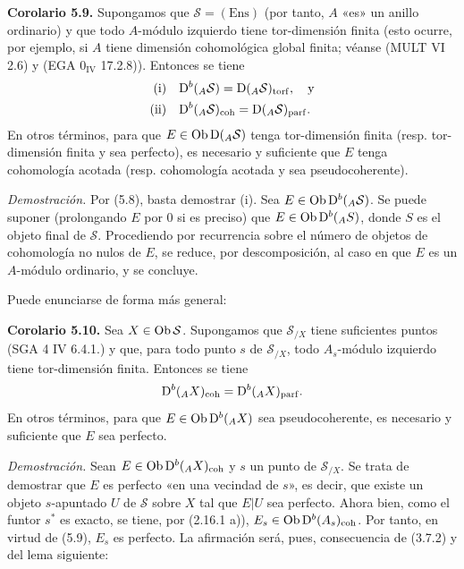 
\providecommand{\sisi}[2]{#2}

\textbf{Corolario 5.9.} Supongamos que \(\sisi{S}{\mathcal S}=(\mathrm{Ens})\) (por tanto, \(A\) «es» un anillo ordinario) y que todo \(A\)-módulo izquierdo tiene tor-dimensión finita (esto ocurre, por ejemplo, si \(A\) tiene dimensión cohomológica global finita; véanse (MULT VI 2.6) y (EGA \(0_{\mathrm{IV}}\) 17.2.8)). Entonces se tiene
\[
\begin{aligned}
\text{(i)}\quad & \Dpx^b({}_A \sisi{S}{\mathcal S})=\Dpx({}_A \sisi{S}{\mathcal S})_{\torf},\quad\text{y}\\
\text{(ii)}\quad & \Dpx^b({}_A \sisi{S}{\mathcal S})_{\mathrm{coh}}=\Dpx({}_A \sisi{S}{\mathcal S})_{\mathrm{parf}}.
\end{aligned}
\]
En otros términos, para que \(E\in\Ob\Dpx({}_A \sisi{S}{\mathcal S})\) tenga tor-dimensión finita (resp. tor-dimensión finita y sea perfecto), es necesario y suficiente que \(E\) tenga cohomología acotada (resp. cohomología acotada y sea pseudocoherente).

\emph{Demostración.} Por (5.8), basta demostrar (i). Sea \(E\in\Ob\Dpx^b({}_A \sisi{S}{\mathcal S})\). Se puede suponer (prolongando \(E\) por \(0\) si es preciso) que \(E\in\operatorname{Ob}\mathrm D^b({}_A S)\), donde \(S\) es el objeto final de \(\sisi{S}{\mathcal S}\). Procediendo por recurrencia sobre el número de objetos de cohomología no nulos de \(E\), se reduce, por descomposición, al caso en que \(E\) es un \(A\)-módulo ordinario, y se concluye.

Puede enunciarse de forma más general:

\textbf{Corolario 5.10.} Sea \(X\in\Ob \sisi{S}{\mathcal S}\). Supongamos que \(\sisi{S}{\mathcal S}_{/X}\) tiene suficientes puntos (SGA 4 IV 6.4.1.) y que, para todo punto \(s\) de \(\sisi{S}{\mathcal S}_{/X}\), todo \(A_s\)-módulo izquierdo tiene tor-dimensión finita. Entonces se tiene
\[
  \mathrm D^b({}_A X)_{\mathrm{coh}}=\mathrm D^b({}_A X)_{\mathrm{parf}}.
\]
En otros términos, para que \(E\in\operatorname{Ob}\mathrm D^b({}_A X)\) sea pseudocoherente, es necesario y suficiente que \(E\) sea perfecto.

\emph{Demostración.} Sean \(E\in\operatorname{Ob}\mathrm D^b({}_A X)_{\mathrm{coh}}\) y \(s\) un punto de \(\sisi{S}{\mathcal S}_{/X}\). Se trata de demostrar que \(E\) es perfecto «en una vecindad de \(s\)», es decir, que existe un objeto \(s\)-apuntado \(U\) de \(\sisi{S}{\mathcal S}\) sobre \(X\) tal que \(E|U\) sea perfecto. Ahora bien, como el funtor \(s^*\) es exacto, se tiene, por (2.16.1 a)), \(E_s\in\operatorname{Ob}\mathrm D^b(A_s)_{\mathrm{coh}}\). Por tanto, en virtud de (5.9), \(E_s\) es perfecto. La afirmación será, pues, consecuencia de (3.7.2) y del lema siguiente:

